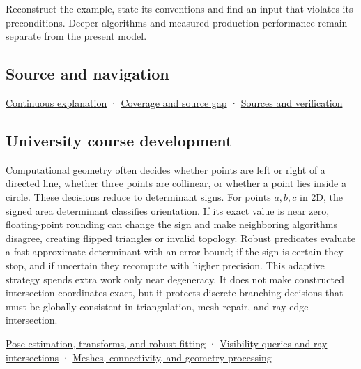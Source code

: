 Reconstruct the example, state its conventions and find an input that violates its preconditions. Deeper algorithms and measured production performance remain separate from the present model.

\subsection{Source and navigation}\label{source-and-navigation}

\href{Continuous\%20Notes/Computing\%20Foundations\%20-\%20From\%20Bits\%20to\%20C++\%20and\%20Systems\%20APIs\#Keep\%20the\%20promises\%20visible\%20while\%20moving\%20between\%20representations}{Continuous explanation} · \hyperref[appendix-fd090d982a15]{Coverage and source gap} · \hyperref[appendix-a103e7846d21]{Sources and verification}

\subsection{University course development}\label{university-course-development}

Computational geometry often decides whether points are left or right of a directed line, whether three points are collinear, or whether a point lies inside a circle. These decisions reduce to determinant signs. For points \(a,b,c\) in 2D, the signed area determinant classifies orientation. If its exact value is near zero, floating-point rounding can change the sign and make neighboring algorithms disagree, creating flipped triangles or invalid topology. Robust predicates evaluate a fast approximate determinant with an error bound; if the sign is certain they stop, and if uncertain they recompute with higher precision. This adaptive strategy spends extra work only near degeneracy. It does not make constructed intersection coordinates exact, but it protects discrete branching decisions that must be globally consistent in triangulation, mesh repair, and ray-edge intersection.

\href{Continuous\%20Notes/University\%20-\%20Worlds,\%20Images\%20and\%20Inference\%20-\%20Graphics,\%20Vision\%20and\%20Photography\#Pose\%20estimation,\%20transforms,\%20and\%20robust\%20fitting}{Pose estimation, transforms, and robust fitting} · \href{Continuous\%20Notes/University\%20-\%20Worlds,\%20Images\%20and\%20Inference\%20-\%20Graphics,\%20Vision\%20and\%20Photography\#Visibility\%20queries\%20and\%20ray\%20intersections}{Visibility queries and ray intersections} · \href{Continuous\%20Notes/University\%20-\%20Worlds,\%20Images\%20and\%20Inference\%20-\%20Graphics,\%20Vision\%20and\%20Photography\#Meshes,\%20connectivity,\%20and\%20geometry\%20processing}{Meshes, connectivity, and geometry processing}
